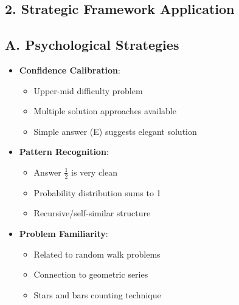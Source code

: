 \documentclass[11pt]{article}
\begin{document}
\begin{strategybox}
\section*{2. Strategic Framework Application}

\subsection*{A. Psychological Strategies}
\begin{itemize}[leftmargin=*]
    \item \textbf{Confidence Calibration}: 
    \begin{itemize}
        \item Upper-mid difficulty problem
        \item Multiple solution approaches available
        \item Simple answer (E) suggests elegant solution
    \end{itemize}
    \item \textbf{Pattern Recognition}:
    \begin{itemize}
        \item Answer $\frac{1}{2}$ is very clean
        \item Probability distribution sums to 1
        \item Recursive/self-similar structure
    \end{itemize}
    \item \textbf{Problem Familiarity}:
    \begin{itemize}
        \item Related to random walk problems
        \item Connection to geometric series
        \item Stars and bars counting technique
    \end{itemize}
\end{itemize}


\end{strategybox}
\end{document}
